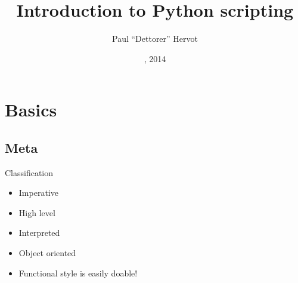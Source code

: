 \documentclass[ignorenonframetext,]{beamer}
\title{Introduction to Python scripting}
\author{Paul ``Dettorer'' Hervot}
\date{, 2014}
\begin{document}
\frame{\titlepage}

\section{Basics}\label{basics}
\subsection{Meta}\label{meta}

\begin{frame}{Classification}
    \begin{itemize}
        \item Imperative
        \item High level
        \item Interpreted
        \item Object oriented
        \item Functional style is easily doable!
    \end{itemize}
\end{frame}
\end{document}
